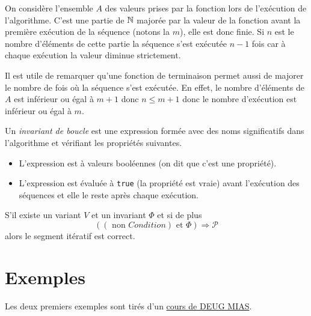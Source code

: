 \begin{demo}
  On considère l'ensemble $A$ des valeurs prises par la fonction lors de l'exécution de l'algorithme. C'est une partie de $\mathbb{N}$ majorée par la valeur de la fonction avant la première exécution de la séquence (notons la $m$), elle est donc finie. Si $n$ est le nombre d'éléments de cette partie la séquence s'est exécutée $n-1$ fois car à chaque exécution la valeur diminue strictement. 
\end{demo}
Il est utile de remarquer qu'une fonction de terminaison permet aussi de majorer le nombre de fois où la séquence s'est exécutée. En effet, le nombre d'éléments de $A$ est inférieur ou égal à $m+1$ donc $n\leq m+1$ donc le nombre d'exécution est inférieur ou égal à $m$.
\begin{defi}
  Un \emph{invariant de boucle} est une expression formée avec des noms significatifs dans l'algorithme et vérifiant les propriétés suivantes.
\begin{itemize}
  \item L'expression est à valeurs booléennes (on dit que c'est une propriété).
  \item L'expression est évaluée à \verb|true| (la propriété est vraie) avant l'exécution des séquences et elle le reste après chaque exécution.
\end{itemize}
\end{defi}
\begin{prop}
S'il existe un variant $V$ et un invariant $\Phi$ et si de plus
\begin{displaymath}
  \left( \left( \text{ non } Condition\right) \text{ et } \Phi \right) \Rightarrow \mathcal{P}
\end{displaymath}
alors le segment itératif est correct.
\end{prop}

\section{Exemples}
Les deux premiers exemples sont tirés d'un \href{http://prolland.free.fr/Cours/Cycle1/MIAS/MIAS2/Complexite/terminaison1.html}{cours de DEUG MIAS}. 

